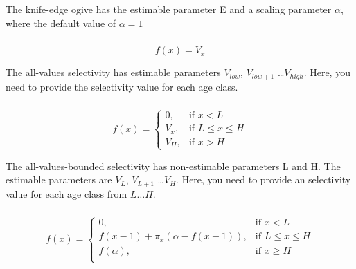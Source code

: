 The knife-edge ogive has the estimable parameter E and a scaling parameter $\alpha$, where the default value of $\alpha = 1$

\subsubsection[All-values]{}

\begin{equation}
f(x)=V_x
\end{equation}

The all-values selectivity has estimable parameters $V_{low}$, $V_{low+1}$ \ldots $V_{high}$. Here, you need to provide the selectivity value for each age class.

\subsubsection[All-values-bounded]{}

\begin{equation}
f(x)=\begin{cases}
		 0, & \text{if $x < L$} \\
		 V_x, & \text{if $L \le x \le H$} \\
		 V_H, & \text{if $x > H$}
  \end{cases}
\end{equation}

The all-values-bounded selectivity has non-estimable parameters L and H. The estimable parameters are $V_L$, $V_{L+1}$ \ldots $V_H$. Here, you need to provide an selectivity value for each age class from $L \ldots H$.

\subsubsection[Increasing]{}

\begin{equation} 
f(x)=\begin{cases}
	  0, & \text{if $x < L$} \\
	  f(x-1)+ \pi_x(\alpha-f(x-1)), & \text{if $L \le x \le H$} \\
	  f(\alpha), & \text{if $x \ge H$} \\  
  \end{cases}
\end{equation}

